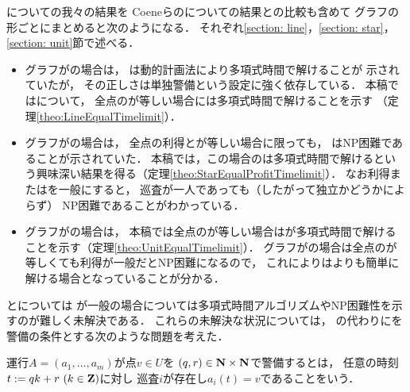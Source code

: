 {\patProb}についての我々の結果を
Coeneらの{\independentPatProb}についての結果との比較も含めて
グラフの形ごとにまとめると次のようになる．
それぞれ\ref{section: line}，\ref{section: star}，\ref{section: unit}節で述べる．
\begin{itemize}
\item 
  グラフが{\graphLine}の場合は，
  {\independentPatProb}は動的計画法により多項式時間で解けることが
  示されていた\cite[Theorem~11]{coene2011charlemagne}が，
  その正しさは単独警備という設定に強く依存している．
  本稿では{\patProb}について，
  全点の{\maxIdletime}が等しい場合には多項式時間で解けることを示す
  （定理\ref{theo:LineEqualTimelimit}）．
\item
  グラフが{\graphStar}の場合は，
  全点の利得と{\maxIdletime}が等しい場合に限っても，
  {\independentPatProb}はNP困難であることが示されていた\cite[Theorem~10]{coene2011charlemagne}．
  本稿では，この場合の{\patProb}は多項式時間で解けるという興味深い結果を得る（定理\ref{theo:StarEqualProfitTimelimit}）．
  なお利得または{\maxIdletime}を一般にすると，
  巡査が一人であっても（したがって独立かどうかによらず）
  NP困難であることがわかっている\cite[Theorems 5 and 6]{coene2011charlemagne}．
\item 
  グラフが{\graphUnit}の場合は，
  本稿では全点の{\maxIdletime}が等しい場合は{\patProb}が多項式時間で解けることを示す（定理\ref{theo:UnitEqualTimelimit}）．
  グラフが{\graphStar}の場合は全点の{\maxIdletime}が等しくても利得が一般だとNP困難になるので，
  これにより{\graphUnit}は{\graphStar}よりも簡単に解ける場合となっていることが分かる．
\end{itemize}


{\graphLine}と{\graphUnit}については
{\maxIdletime}が一般の場合については多項式時間アルゴリズムやNP困難性を示すのが難しく未解決である．
これらの未解決な状況については，
{\maxIdletime}の代わりに{\exactIdletime}を警備の条件とする次のような問題を考えた．

\begin{defi}
運行$A = (a _1, \ldots, a _m)$が点$v \in U$を
{\exactIdletime}$(q, r) \in \mathbf N \times \mathbf N$で警備するとは，
任意の時刻$t := q k + r\ (k \in \mathbf Z)$に対し
巡査$i$が存在し$a _i (t) = v$であることをいう．
\end{defi}


